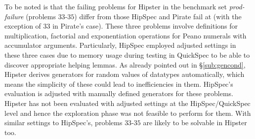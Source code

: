 To be noted is that the failing problems for Hipster in the benchmark set \emph{prod-failure} (problems $33$-$35$) differ from those HipSpec and Pirate fail at (with the exception of $33$ in Pirate's case).
%
These three problems involve definitions for multiplication, factorial and exponentiation operations for Peano numerals with accumulator arguments.
%
Particularly, HipSpec employed adjusted settings in these three cases due to memory usage during testing in QuickSpec to be able to discover appropriate helping lemmas.
%
As already pointed out in \S \ref{sub:gencond}, Hipster derives generators for random values of datatypes automatically, which means the simplicity of these could lead to inefficiencies in them.
%
HipSpec's evaluation is adjusted with manually defined generators for these problems.
%
Hipster has not been evaluated with adjusted settings at the HipSpec/QuickSpec level and hence the exploration phase was not feasible to perform for them.
%
With similar settings to HipSpec's, problems $33$-$35$ are likely to be solvable in Hipster too.

